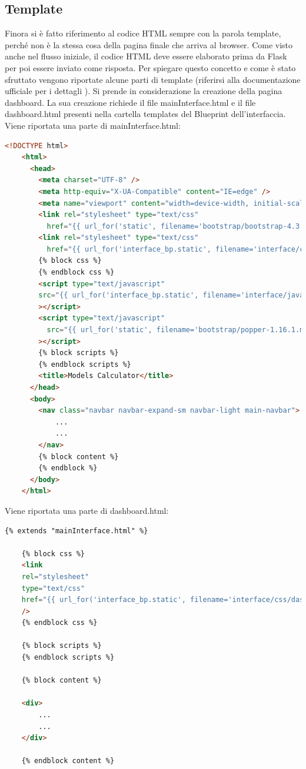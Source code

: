 \subsection{Template}
\label{secsub:flask-creazione-template}
Finora si è fatto riferimento al codice HTML sempre con la parola template,
perché non è la stessa cosa della pagina finale che arriva al browser.
Come visto anche nel flusso iniziale, il codice HTML deve essere elaborato prima da Flask
per poi essere inviato come risposta.
Per spiegare questo concetto e come è stato sfruttato vengono riportate alcune parti di template
(riferirsi alla documentazione ufficiale per i dettagli \cite{flask-doc-templates}).
Si prende in considerazione la creazione della pagina dashboard.
La sua creazione richiede il file mainInterface.html e il file dashboard.html presenti nella cartella
templates del Blueprint dell'interfaccia.
Viene riportata una parte di mainInterface.html:
\begin{lstlisting}[language=html]
	<!DOCTYPE html>
	<html>
	  <head>
		<meta charset="UTF-8" />
		<meta http-equiv="X-UA-Compatible" content="IE=edge" />
		<meta name="viewport" content="width=device-width, initial-scale=1.0" />
		<link rel="stylesheet" type="text/css"
		  href="{{ url_for('static', filename='bootstrap/bootstrap-4.3.1.min.css') }}"/>
		<link rel="stylesheet" type="text/css"
		  href="{{ url_for('interface_bp.static', filename='interface/css/mainInterface.css') }}"/>  
		{% block css %}
		{% endblock css %}
		<script type="text/javascript"
		src="{{ url_for('interface_bp.static', filename='interface/javascript/mainInterface.js')}}"
		></script>
		<script type="text/javascript"
		  src="{{ url_for('static', filename='bootstrap/popper-1.16.1.min.js')}}"
		></script>
		{% block scripts %}
		{% endblock scripts %}
		<title>Models Calculator</title>
	  </head>
	  <body>
		<nav class="navbar navbar-expand-sm navbar-light main-navbar">
			...
			...
		</nav>
		{% block content %}
		{% endblock %}
	  </body>
	</html>
\end{lstlisting}
Viene riportata una parte di dashboard.html:
\begin{lstlisting}[language=html]
	{% extends "mainInterface.html" %}

	{% block css %}
	<link
	rel="stylesheet"
	type="text/css"
	href="{{ url_for('interface_bp.static', filename='interface/css/dashboard.css') }}"
	/>  
	{% endblock css %}
	
	{% block scripts %}
	{% endblock scripts %}
	
	{% block content %}
	
	<div>
		...
		...
	</div>
	
	{% endblock content %}
\end{lstlisting}
